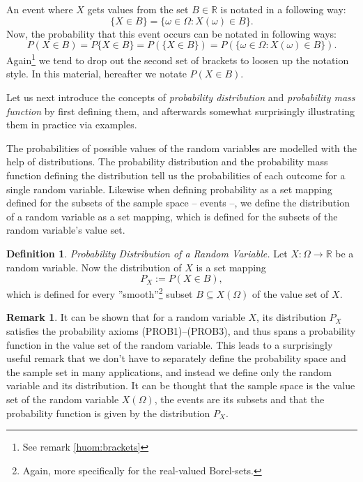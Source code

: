 \documentclass[12pt,a4paper,leqno]{report}
\newcommand{\R}{\mathbb{R}}
\theoremstyle{plain}
\theoremstyle{definition}
\newtheorem{maar}[equation]{Definition}
\newtheorem{remark}[equation]{Remark}
\begin{document}
\bigskip

An event where $X$ gets values from the set $B \in \R$ is notated in a following way:
\[
\{X \in B\} = \{\omega \in \Omega : X(\omega) \in B\}. 
\]
Now, the probability that this event occurs can be notated in following ways:
\[
P(X \in B) = P\{X \in B\} = P(\{X \in B\}) = P(\{\omega \in \Omega : X(\omega) \in B\} ). 
\]
Again\footnote{See remark \ref{huom:brackets}} we tend to drop out the second set of brackets to loosen up the notation style. In this material, hereafter we notate $P(X \in B)$.

Let us next introduce the concepts of \emph{probability distribution} and \emph{probability mass function} by first defining them, and afterwards somewhat surprisingly illustrating them in practice via examples.

The probabilities of possible values of the random variables are modelled with the help of distributions. The probability distribution and the probability mass function defining the distribution tell us the probabilities of each outcome for a single random variable. Likewise when defining probability as a set mapping defined for the subsets of the sample space -- events --, we define the distribution of a random variable as a set mapping, which is defined for the subsets of the random variable's value set.

\begin{maar}
\emph{Probability Distribution of a Random Variable.}  Let $X: \Omega \rightarrow \R$ be a random variable. Now the distribution of $X$ is a set mapping 
\[
P_X := P(X \in B),
\]
which is defined for every ''smooth''\footnote{Again, more specifically for the real-valued Borel-sets.} subset $B \subseteq X(\Omega)$ of the value set of $X$.
\end{maar}

\begin{remark}
It can be shown that for a random variable $X$, its distribution $P_X$ satisfies the probability axioms (PROB1)--(PROB3), and thus spans a probability function in the value set of the random variable. This leads to a surprisingly useful remark that we don't have to separately define the probability space and the sample set in many applications, and instead we define only the random variable and its distribution. It can be thought that the sample space is the value set of the random variable $X(\Omega)$, the events are its subsets and that the probability function is given by the distribution $P_X$.
\end{remark}
\end{document}
